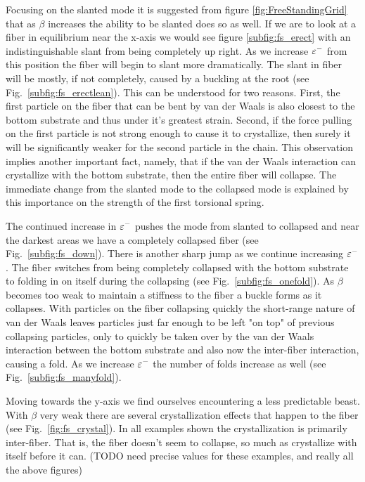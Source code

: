 Focusing on the slanted mode it is suggested from figure \ref{fig:FreeStandingGrid} that as $\beta$ increases the ability to be slanted does so as well. If we are to look at a fiber in equilibrium near the x-axis we would see figure \ref{subfig:fs_erect} with an indistinguishable slant from being completely up right. As we increase $\varepsilon^-$ from this position the fiber will begin to slant more dramatically. The slant in fiber will be mostly, if not completely, caused by a buckling at the root (see Fig.~\ref{subfig:fs_erectlean}). This can be understood for two reasons. First, the first particle on the fiber that can be bent by van der Waals is also closest to the bottom substrate and thus under it's greatest strain. Second, if the force pulling on the first particle is not strong enough to cause it to crystallize, then surely it will be significantly weaker for the second particle in the chain. This observation implies another important fact, namely, that if the van der Waals interaction can crystallize with the bottom substrate, then the entire fiber will collapse. The immediate change from the slanted mode to the collapsed mode is explained by this importance on the strength of the first torsional spring.
	
The continued increase in $\varepsilon^-$ pushes the mode from slanted to collapsed and near the darkest areas we have a completely collapsed fiber (see Fig.~\ref{subfig:fs_down}). There is another sharp jump as we continue increasing $\varepsilon^-$. The fiber switches from being completely collapsed with the bottom substrate to folding in on itself during the collapsing (see Fig.~\ref{subfig:fs_onefold}). As $\beta$ becomes too weak to maintain a stiffness to the fiber a buckle forms as it collapses. With particles on the fiber collapsing quickly the short-range nature of van der Waals leaves particles just far enough to be left "on top" of previous collapsing particles, only to quickly be taken over by the van der Waals interaction between the bottom substrate and also now the inter-fiber interaction, causing a fold. As we increase $\varepsilon^-$ the number of folds increase as well (see Fig.~\ref{subfig:fs_manyfold}).
	
Moving towards the y-axis we find ourselves encountering a less predictable beast. With $\beta$ very weak there are several crystallization effects that happen to the fiber (see Fig.~\ref{fig:fs_crystal}). In all examples shown the crystallization is primarily inter-fiber. That is, the fiber doesn't seem to collapse, so much as crystallize with itself before it can. (TODO need precise values for these examples, and really all the above figures)

